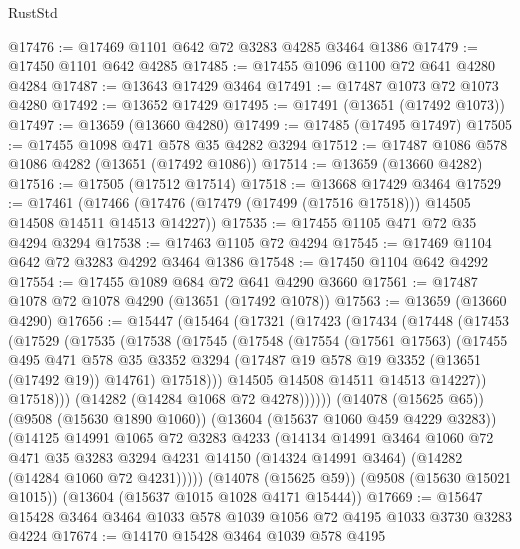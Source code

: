 \begin{lexlean}{RustStd}
\begin{coremodule}
@17476 := @17469 @1101 @642 @72 @3283 @4285 @3464 @1386
@17479 := @17450 @1101 @642 @4285
@17485 := @17455 @1096 @1100 @72 @641 @4280 @4284
@17487 := @13643 @17429 @3464
@17491 := @17487 @1073 @72 @1073 @4280
@17492 := @13652 @17429
@17495 := @17491 (@13651 (@17492 @1073))
@17497 := @13659 (@13660 @4280)
@17499 := @17485 (@17495 @17497)
@17505 := @17455 @1098 @471 @578 @35 @4282 @3294
@17512 := @17487 @1086 @578 @1086 @4282 (@13651 (@17492 @1086))
@17514 := @13659 (@13660 @4282)
@17516 := @17505 (@17512 @17514)
@17518 := @13668 @17429 @3464
@17529 := @17461
    (@17466 (@17476 (@17479 (@17499 (@17516 @17518))) @14505 @14508 @14511 @14513 @14227))
@17535 := @17455 @1105 @471 @72 @35 @4294 @3294
@17538 := @17463 @1105 @72 @4294
@17545 := @17469 @1104 @642 @72 @3283 @4292 @3464 @1386
@17548 := @17450 @1104 @642 @4292
@17554 := @17455 @1089 @684 @72 @641 @4290 @3660
@17561 := @17487 @1078 @72 @1078 @4290 (@13651 (@17492 @1078))
@17563 := @13659 (@13660 @4290)
@17656 := @15447
    (@15464
      (@17321
        (@17423
          (@17434
            (@17448
              (@17453
                (@17529
                  (@17535
                    (@17538
                      (@17545
                        (@17548
                          (@17554
                            (@17561 @17563)
                            (@17455
                              @495
                              @471
                              @578
                              @35
                              @3352
                              @3294
                              (@17487 @19 @578 @19 @3352 (@13651 (@17492 @19)) @14761)
                              @17518)))
                        @14505
                        @14508
                        @14511
                        @14513
                        @14227))
                    @17518)))
              (@14282 (@14284 @1068 @72 @4278))))))
      (@14078 (@15625 @65))
      (@9508 (@15630 @1890 @1060))
      (@13604 (@15637 @1060 @459 @4229 @3283))
      (@14125
        @14991
        @1065
        @72
        @3283
        @4233
        (@14134
          @14991
          @3464
          @1060
          @72
          @471
          @35
          @3283
          @3294
          @4231
          @14150
          (@14324 @14991 @3464)
          (@14282 (@14284 @1060 @72 @4231)))))
    (@14078 (@15625 @59))
    (@9508 (@15630 @15021 @1015))
    (@13604 (@15637 @1015 @1028 @4171 @15444))
@17669 := @15647 @15428 @3464 @3464 @1033 @578 @1039 @1056 @72 @4195 @1033 @3730 @3283 @4224
@17674 := @14170 @15428 @3464 @1039 @578 @4195

\end{coremodule}
\end{lexlean}
